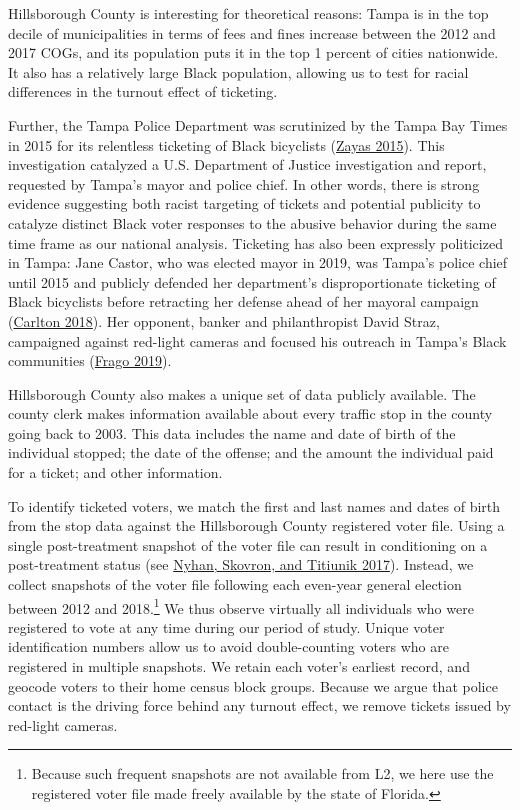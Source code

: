 \documentclass[
  12pt,
]{article}
\begin{document}
Hillsborough County is interesting for theoretical reasons: Tampa is in the top decile of municipalities in terms of fees and fines increase between the 2012 and 2017 COGs, and its population puts it in the top 1 percent of cities nationwide. It also has a relatively large Black population, allowing us to test for racial differences in the turnout effect of ticketing.

Further, the Tampa Police Department was scrutinized by the Tampa Bay Times in 2015 for its relentless ticketing of Black bicyclists (\protect\hyperlink{ref-Zayas2015}{Zayas 2015}). This investigation catalyzed a U.S. Department of Justice investigation and report, requested by Tampa's mayor and police chief. In other words, there is strong evidence suggesting both racist targeting of tickets and potential publicity to catalyze distinct Black voter responses to the abusive behavior during the same time frame as our national analysis. Ticketing has also been expressly politicized in Tampa: Jane Castor, who was elected mayor in 2019, was Tampa's police chief until 2015 and publicly defended her department's disproportionate ticketing of Black bicyclists before retracting her defense ahead of her mayoral campaign (\protect\hyperlink{ref-Carlton2018}{Carlton 2018}). Her opponent, banker and philanthropist David Straz, campaigned against red-light cameras and focused his outreach in Tampa's Black communities (\protect\hyperlink{ref-Frago2019}{Frago 2019}).

Hillsborough County also makes a unique set of data publicly available. The county clerk makes information available about every traffic stop in the county going back to 2003. This data includes the name and date of birth of the individual stopped; the date of the offense; and the amount the individual paid for a ticket; and other information.

To identify ticketed voters, we match the first and last names and dates of birth from the stop data against the Hillsborough County registered voter file. Using a single post-treatment snapshot of the voter file can result in conditioning on a post-treatment status (see \protect\hyperlink{ref-Nyhan2017}{Nyhan, Skovron, and Titiunik 2017}). Instead, we collect snapshots of the voter file following each even-year general election between 2012 and 2018.\footnote{Because such frequent snapshots are not available from L2, we here use the registered voter file made freely available by the state of Florida.} We thus observe virtually all individuals who were registered to vote at any time during our period of study. Unique voter identification numbers allow us to avoid double-counting voters who are registered in multiple snapshots. We retain each voter's earliest record, and geocode voters to their home census block groups. Because we argue that police contact is the driving force behind any turnout effect, we remove tickets issued by red-light cameras.
\end{document}
